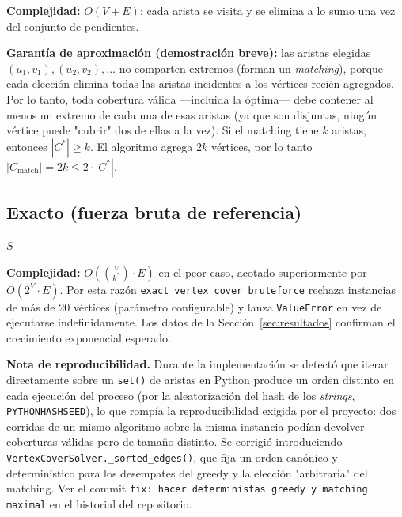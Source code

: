 \documentclass[11pt,a4paper]{article}
\begin{document}
\textbf{Complejidad:} $O(V+E)$: cada arista se visita y se elimina a lo sumo una vez del
conjunto de pendientes.

\textbf{Garantía de aproximación (demostración breve):} las aristas elegidas $(u_1,v_1),
(u_2,v_2), \dots$ no comparten extremos (forman un \emph{matching}), porque cada elección
elimina todas las aristas incidentes a los vértices recién agregados. Por lo tanto, toda
cobertura válida —incluida la óptima— debe contener al menos un extremo de cada una de esas
aristas (ya que son disjuntas, ningún vértice puede "cubrir" dos de ellas a la vez). Si el
matching tiene $k$ aristas, entonces $|C^{*}| \geq k$. El algoritmo agrega $2k$ vértices, por
lo tanto $|C_{\text{match}}| = 2k \leq 2 \cdot |C^{*}|$.

\subsection{Exacto (fuerza bruta de referencia)}
\begin{algorithm}[H]
\caption{\texttt{exact\_vertex\_cover\_bruteforce}}
\begin{algorithmic}[1]
			\State \Return $S$
		\EndIf
	\EndFor
\EndFor
\end{algorithmic}
\end{algorithm}

\textbf{Complejidad:} $O\left(\binom{V}{k^{*}} \cdot E\right)$ en el peor caso, acotado
superiormente por $O(2^{V} \cdot E)$. Por esta razón \texttt{exact\_vertex\_cover\_bruteforce}
rechaza instancias de más de 20 vértices (parámetro configurable) y lanza
\texttt{ValueError} en vez de ejecutarse indefinidamente. Los datos de la
Sección~\ref{sec:resultados} confirman el crecimiento exponencial esperado.

\textbf{Nota de reproducibilidad.} Durante la implementación se detectó que iterar
directamente sobre un \texttt{set()} de aristas en Python produce un orden distinto en cada
ejecución del proceso (por la aleatorización del hash de los \textit{strings},
\texttt{PYTHONHASHSEED}), lo que rompía la reproducibilidad exigida por el proyecto: dos
corridas de un mismo algoritmo sobre la misma instancia podían devolver coberturas válidas
pero de tamaño distinto. Se corrigió introduciendo \texttt{VertexCoverSolver.\_sorted\_edges()},
que fija un orden canónico y determinístico para los desempates del greedy y la elección
"arbitraria" del matching. Ver el commit \texttt{fix: hacer deterministas greedy y matching
maximal} en el historial del repositorio.
\end{document}
